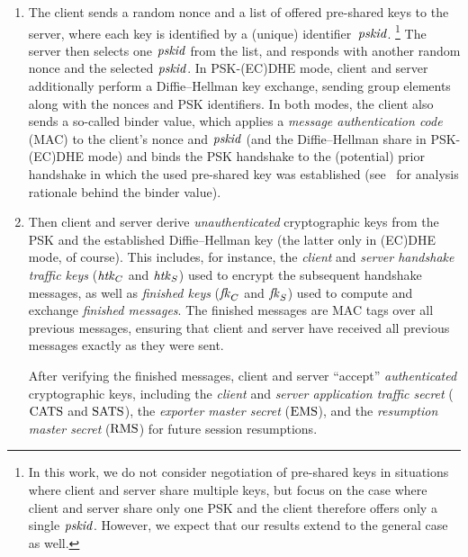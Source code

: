 \begin{enumerate}
	\item The client sends a random nonce and a list of offered pre-shared keys to the server, where each key is identified by a (unique) identifier~$\mathit{pskid}$.%
	\footnote{%
	In this work, we do not consider negotiation of pre-shared keys in situations where client and server share multiple keys, but focus on the case where client and server share only one PSK and the client therefore offers only a single $\mathit{pskid}$.
	However, we expect that our results extend to the general case as well.
	}
	The server then selects one $\mathit{pskid}$ from the list, and responds with another random nonce and the selected $\mathit{pskid}$.
	In PSK-(EC)DHE mode, client and server additionally perform a Diffie--Hellman key exchange, sending group elements along with the nonces and PSK identifiers. 
	In both modes, the client also sends a so-called binder value,
	which applies a \textit{message authentication code} (MAC) to the client's nonce and $\mathit{pskid}$ (and the Diffie--Hellman share in PSK-(EC)DHE mode)
	and binds the PSK handshake to the (potential) prior handshake in which the used pre-shared key was established (see~\cite{SP:CHSv16,CCS:Krawczyk16} for analysis rationale behind the binder value).

	\item Then client and server derive \emph{unauthenticated} cryptographic keys from the PSK and the established Diffie--Hellman key (the latter only in (EC)DHE mode, of course).
	This includes, for instance, the \emph{client} and \emph{server handshake traffic keys} ($\mathit{htk}_C$ and $\mathit{htk}_S$) used to encrypt the subsequent handshake messages, as well as \emph{finished keys} ($\mathit{fk}_C$ and $\mathit{fk}_S$) used to compute and exchange \emph{finished messages}.
	The finished messages are MAC tags over all previous messages, ensuring that client and server have received all previous messages exactly as they were sent.

	After verifying the finished messages, client and server ``accept'' \emph{authenticated} cryptographic keys, including the \emph{client} and \emph{server application traffic secret} ($\mathrm{CATS}$ and $\mathrm{SATS}$), the \emph{exporter master secret} ($\mathrm{EMS}$), and the \emph{resumption master secret} ($\mathrm{RMS}$) for future session resumptions.
\end{enumerate}





